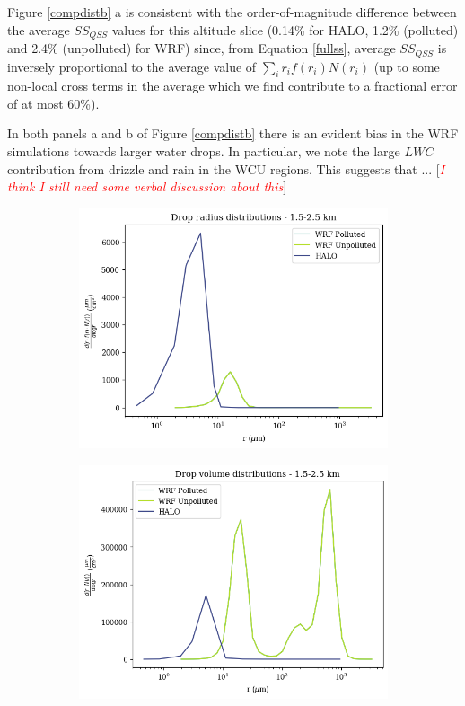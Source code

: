 \documentclass{article}
\newcommand{\klcomm}[1]{\textcolor{red}{\textit{#1}}}
\begin{document}
Figure \ref{compdistb} a is consistent with the order-of-magnitude difference between the average $SS_{QSS}$ values for this altitude slice (0.14\% for HALO, 1.2\% (polluted) and 2.4\% (unpolluted) for WRF) since, from Equation \ref{fullss}, average $SS_{QSS}$ is inversely proportional to the average value of $\sum\limits_{i}r_if(r_i)N(r_i)$ (up to some non-local cross terms in the average which we find contribute to a fractional error of at most 60\%). 

In both panels a and b of Figure \ref{compdistb} there is an evident bias in the WRF simulations towards larger water drops. In particular, we note the large $LWC$ contribution from drizzle and rain in the WCU regions. This suggests that ... [\klcomm{I think I still need some verbal discussion about this}]

\begin{figure}[ht]
	\centering
	\begin{subfigure}{0.7\textwidth}
		\includegraphics[width=\textwidth]{halo/compare_radius_distributions_figure.png}
		\label{compraddistb}
		\caption{}
	\end{subfigure}
	\begin{subfigure}{0.7\textwidth}
		\includegraphics[width=\textwidth]{halo/compare_vol_distributions_figure.png}

\end{subfigure}
\end{figure}
\end{document}
